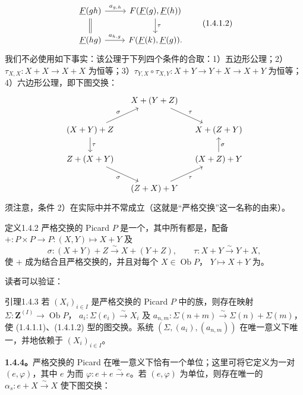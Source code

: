\[\begin{tikzcd}
\underline F(gh)\arrow[r,"{a_{g,h}}"]\arrow[d,equal]&F(\underline F(g),\underline F(h))\arrow[d,"\tau"]\\
\underline F(hg)\arrow[r,"{a_{h,g}}"]&F(\underline F(k),\underline F(g)).
\end{tikzcd}\tag{1.4.1.2}\]
我们不必使用如下事实：该公理于下列四个条件的合取：1）五边形公理；2）$\tau_{X,X}:X+X\to X+X$ 为恒等；3）$\tau_{Y,X}\circ\tau_{X,Y}:X+Y\to Y+X\to X+Y$ 为恒等；4）六边形公理，即下图交换：
\[\begin{tikzcd}[column sep=small]
&X+(Y+Z)\arrow[dr,"\tau"]&\\
(X+Y)+Z\arrow[ur,"\sigma"]\arrow[d,"\tau"]&&X+(Z+Y)\\
Z+(X+Y)\arrow[dr,"\sigma"']&&(X+Z)+Y\arrow[u,"\sigma"']\\
&(Z+X)+Y\arrow[ur,"\tau"']&
\end{tikzcd}\]
须注意，条件 2）在实际中并不常成立（这就是“严格交换”这一名称的由来）。
\begin{SGAresult}{定义}{1.4.2}
严格交换的 Picard  $P$ 是一个，其中所有都是，配备 $+:P\times P\to P:(X,Y)\mapsto X+Y$ 及
\[\sigma:(X+Y)+Z\xrightarrow\sim X+(Y+Z),\qquad\tau:X+Y\xrightarrow\sim Y+X,\]
使 $+$ 成为结合且严格交换的，并且对每个 $X\in\operatorname{Ob}P$， $Y\mapsto X+Y$ 为。
\end{SGAresult}
读者可以验证：
\begin{SGAresult}{引理}{1.4.3}
若 $(X_i)_{i\in I}$ 是严格交换的 Picard  $P$ 中的族，则存在映射 $\Sigma:\mathbf Z^{(I)}\to\operatorname{Ob}P$， $a_i:\Sigma(e_i)\xrightarrow\sim X_i$ 及 $a_{n,m}:\Sigma(n+m)\xrightarrow\sim\Sigma(n)+\Sigma(m)$，使 (1.4.1.1)、(1.4.1.2) 型的图交换。系统 $(\Sigma,(a_i),(a_{n,m}))$ 在唯一意义下唯一，并地依赖于 $(X_i)_{i\in I}$。
\end{SGAresult}
\textbf{1.4.4。}严格交换的 Picard 在唯一意义下恰有一个单位；这里可将它定义为一对 $(e,\varphi)$，其中 $e$ 为而 $\varphi:e+e\xrightarrow\sim e$。若 $(e,\varphi)$ 为单位，则存在唯一的 $\alpha_s:e+X\xrightarrow\sim X$ 使下图交换：
